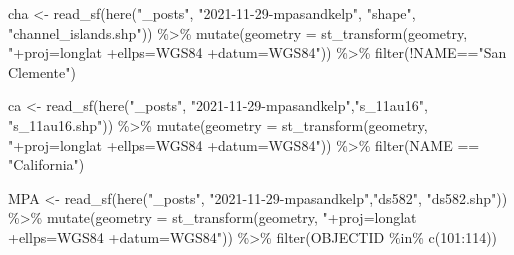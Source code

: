 \documentclass[
]{article}
\newenvironment{Shaded}{\begin{snugshade}}{\end{snugshade}}
\newcommand{\AttributeTok}[1]{\textcolor[rgb]{0.77,0.63,0.00}{#1}}
\newcommand{\DecValTok}[1]{\textcolor[rgb]{0.00,0.00,0.81}{#1}}
\newcommand{\FunctionTok}[1]{\textcolor[rgb]{0.00,0.00,0.00}{#1}}
\newcommand{\NormalTok}[1]{#1}
\newcommand{\OtherTok}[1]{\textcolor[rgb]{0.56,0.35,0.01}{#1}}
\newcommand{\SpecialCharTok}[1]{\textcolor[rgb]{0.00,0.00,0.00}{#1}}
\newcommand{\StringTok}[1]{\textcolor[rgb]{0.31,0.60,0.02}{#1}}
\begin{document}
\begin{Shaded}
\begin{Highlighting}[]
\NormalTok{cha }\OtherTok{\textless{}{-}} \FunctionTok{read\_sf}\NormalTok{(}\FunctionTok{here}\NormalTok{(}\StringTok{"\_posts"}\NormalTok{, }\StringTok{"2021{-}11{-}29{-}mpasandkelp"}\NormalTok{, }\StringTok{"shape"}\NormalTok{, }\StringTok{"channel\_islands.shp"}\NormalTok{)) }\SpecialCharTok{\%\textgreater{}\%} 
  \FunctionTok{mutate}\NormalTok{(}\AttributeTok{geometry =} \FunctionTok{st\_transform}\NormalTok{(geometry, }\StringTok{"+proj=longlat +ellps=WGS84 +datum=WGS84"}\NormalTok{)) }\SpecialCharTok{\%\textgreater{}\%} 
  \FunctionTok{filter}\NormalTok{(}\SpecialCharTok{!}\NormalTok{NAME}\SpecialCharTok{==}\StringTok{"San Clemente"}\NormalTok{)}

\NormalTok{ca }\OtherTok{\textless{}{-}} \FunctionTok{read\_sf}\NormalTok{(}\FunctionTok{here}\NormalTok{(}\StringTok{"\_posts"}\NormalTok{, }\StringTok{"2021{-}11{-}29{-}mpasandkelp"}\NormalTok{,}\StringTok{"s\_11au16"}\NormalTok{, }\StringTok{"s\_11au16.shp"}\NormalTok{)) }\SpecialCharTok{\%\textgreater{}\%} 
  \FunctionTok{mutate}\NormalTok{(}\AttributeTok{geometry =} \FunctionTok{st\_transform}\NormalTok{(geometry, }\StringTok{"+proj=longlat +ellps=WGS84 +datum=WGS84"}\NormalTok{)) }\SpecialCharTok{\%\textgreater{}\%} 
  \FunctionTok{filter}\NormalTok{(NAME }\SpecialCharTok{==} \StringTok{"California"}\NormalTok{)}

\NormalTok{MPA }\OtherTok{\textless{}{-}} \FunctionTok{read\_sf}\NormalTok{(}\FunctionTok{here}\NormalTok{(}\StringTok{"\_posts"}\NormalTok{, }\StringTok{"2021{-}11{-}29{-}mpasandkelp"}\NormalTok{,}\StringTok{"ds582"}\NormalTok{, }\StringTok{"ds582.shp"}\NormalTok{)) }\SpecialCharTok{\%\textgreater{}\%}   
  \FunctionTok{mutate}\NormalTok{(}\AttributeTok{geometry =} \FunctionTok{st\_transform}\NormalTok{(geometry, }\StringTok{"+proj=longlat +ellps=WGS84 +datum=WGS84"}\NormalTok{)) }\SpecialCharTok{\%\textgreater{}\%} 
  \FunctionTok{filter}\NormalTok{(OBJECTID }\SpecialCharTok{\%in\%} \FunctionTok{c}\NormalTok{(}\DecValTok{101}\SpecialCharTok{:}\DecValTok{114}\NormalTok{))}




\end{Highlighting}
\end{Shaded}
\end{document}
